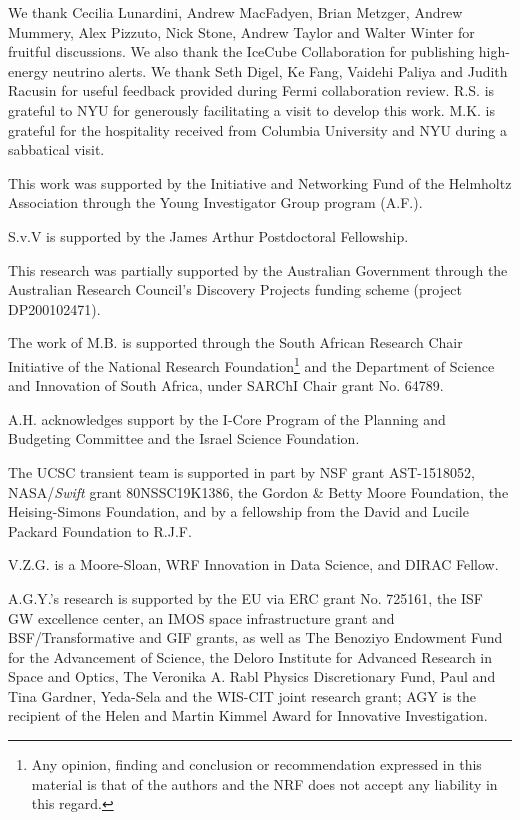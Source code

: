 \documentclass{nature_plusfigure}
\begin{document}
\begin{addendum}
\item We thank Cecilia Lunardini, Andrew MacFadyen, Brian Metzger, Andrew Mummery, Alex Pizzuto, Nick Stone, Andrew Taylor and Walter Winter for fruitful discussions. We also thank the IceCube Collaboration for publishing high-energy neutrino alerts. We thank Seth Digel, Ke Fang, Vaidehi Paliya and Judith Racusin for useful feedback provided during Fermi collaboration review. R.S. is grateful to NYU for generously facilitating a visit to develop this work.  M.K. is grateful for the hospitality received from Columbia University and NYU during a sabbatical visit. 

This work was supported by the Initiative and Networking Fund of the Helmholtz Association through the Young Investigator Group program (A.F.).

S.v.V is supported by the James Arthur Postdoctoral Fellowship.

This research was partially supported by the Australian Government through the Australian Research Council's Discovery Projects funding scheme (project DP200102471). 

The work of M.B. is supported through the South African Research Chair Initiative of the National 
Research Foundation\footnote{Any opinion, finding and conclusion or recommendation expressed in 
this material is that of the authors and the NRF does not accept any liability in this regard.} 
and the Department of Science and Innovation of South Africa, under SARChI Chair grant No. 64789.

A.H. acknowledges support by the I-Core Program of the Planning and Budgeting Committee
and the Israel Science Foundation.

The UCSC transient team is supported in part by NSF grant AST-1518052, NASA/{\it Swift} grant 80NSSC19K1386, the Gordon \& Betty Moore Foundation, the Heising-Simons Foundation, and by a fellowship from the David and Lucile Packard Foundation to R.J.F. 

V.Z.G. is a Moore-Sloan, WRF Innovation in Data Science, and DIRAC Fellow.

A.G.Y.’s research is supported by the EU via ERC grant No. 725161, the ISF GW excellence center, an IMOS space infrastructure grant and BSF/Transformative and GIF grants, as well as The Benoziyo Endowment Fund for the Advancement of Science, the Deloro Institute for Advanced Research in Space and Optics, The Veronika A. Rabl Physics Discretionary Fund, Paul and Tina Gardner, Yeda-Sela and the WIS-CIT joint research grant;  AGY is the recipient of the Helen and Martin Kimmel Award for Innovative Investigation.


\end{addendum}
\end{document}
